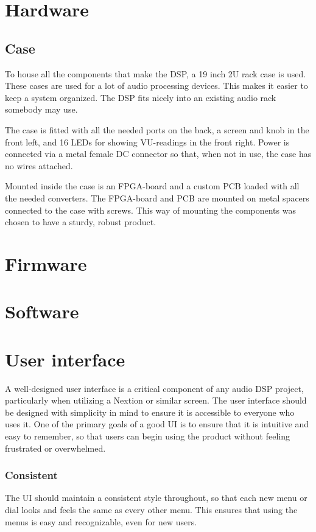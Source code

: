 \section{Hardware}

\subsection{Case}
To house all the components that make the DSP, a 19 inch 2U rack case is used. These cases are used for a lot of audio processing devices. This makes it easier to keep a system organized. The DSP fits nicely into an existing audio rack somebody may use.
\par 
\noindent The case is fitted with all the needed ports on the back, a screen and knob in the front left, and 16 LEDs for showing VU-readings in the front right. Power is connected via a metal female DC connector so that, when not in use, the case has no wires attached. 
\par
\noindent Mounted inside the case is an FPGA-board and a custom PCB loaded with all the needed converters. The FPGA-board and PCB are mounted on metal spacers connected to the case with screws. This way of mounting the components was chosen to have a sturdy, robust product.

\section{Firmware}

\section{Software}

\section{User interface}

A well-designed user interface is a critical component of any audio DSP project, particularly when utilizing a Nextion or similar screen. The user interface should be designed with simplicity in mind to ensure it is accessible to everyone who uses it. One of the primary goals of a good UI is to ensure that it is intuitive and easy to remember, so that users can begin using the product without feeling frustrated or overwhelmed.

\subsubsection*{Consistent}
The UI should maintain a consistent style throughout, so that each new menu or dial looks and feels the same as every other menu. This ensures that using the menus is easy and recognizable, even for new users.

